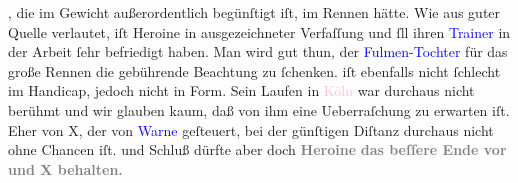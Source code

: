 {{                  , die im Gewicht außerordentlich begünſtigt
                  iſt, im Rennen hätte. Wie aus guter Quelle verlautet, iſt Heroine in
                  ausgezeichneter Verfaſſung und ſll ihren \textcolor{blue}{Trainer}{}\ledrightnote{{$\rightarrow$}\textcolor{blue}{A. Beit}} in der Arbeit ſehr befriedigt
                  haben. Man wird gut thun, der \textcolor{blue}{Fulmen-Tochter}{}\ledrightnote{{$\rightarrow$}\textcolor{blue}{Lydia von Fulmen}} für das große Rennen die gebührende
                  Beachtung zu ſchenken.  iſt ebenfalls nicht
                  ſchlecht im Handicap, jedoch nicht in Form. Sein Laufen in \textcolor{pink}{Köln}{}\ledrightnote{\textcolor{pink}{Köln}} war durchaus nicht berühmt und wir glauben kaum, daß
                  von ihm eine Ueberraſchung zu erwarten iſt. Eher von \textsc{X},
                  der von \textcolor{blue}{Warne}{}\ledrightnote{\textcolor{blue}{W. Warne}} geſteuert, bei der günſtigen
                  Diſtanz durchaus nicht ohne Chancen iſt.  und  Schluß dürfte aber doch}}\pend
           \pstart
           \centering{}\textcolor{gray}{\textbf{\textbf{Heroine}}}\pend
           \pstart
           \noindent{}\textcolor{gray}{\textbf{das beſſere Ende vor}}{ }\textcolor{green}{\textcolor{gray}{\textbf{}}}{}\ledrightnote{\textcolor{green}{Liebelei. Schauspiel in drei Akten}}\textcolor{gray}{\textbf{{ }und \textsc{X} behalten.}}\pend
           \endnumbering{}\begin{anhang}\end{anhang}
      